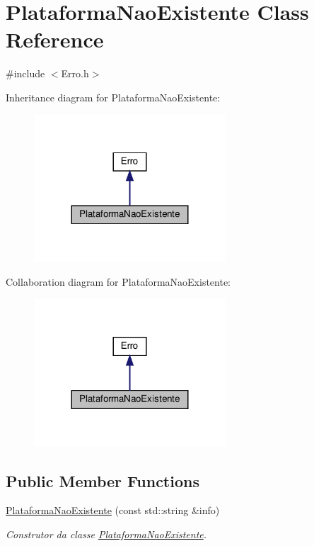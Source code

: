 \hypertarget{classPlataformaNaoExistente}{}\section{Plataforma\+Nao\+Existente Class Reference}
\label{classPlataformaNaoExistente}


{\ttfamily \#include $<$Erro.\+h$>$}



Inheritance diagram for Plataforma\+Nao\+Existente\+:
\nopagebreak
\begin{figure}[H]
\begin{center}
\leavevmode
\includegraphics[width=203pt]{classPlataformaNaoExistente__inherit__graph}
\end{center}
\end{figure}


Collaboration diagram for Plataforma\+Nao\+Existente\+:
\nopagebreak
\begin{figure}[H]
\begin{center}
\leavevmode
\includegraphics[width=203pt]{classPlataformaNaoExistente__coll__graph}
\end{center}
\end{figure}
\subsection*{Public Member Functions}
\begin{DoxyCompactItemize}
\item 
\hyperlink{classPlataformaNaoExistente_ada0f9e32fe5f64550905ce8e35e8ab34}{Plataforma\+Nao\+Existente} (const std\+::string \&info)
\begin{DoxyCompactList}\small\item\em Construtor da classe \hyperlink{classPlataformaNaoExistente}{Plataforma\+Nao\+Existente}. \end{DoxyCompactList}\end{DoxyCompactItemize}


